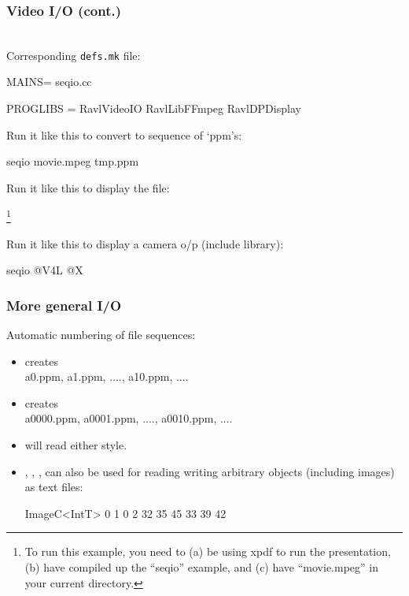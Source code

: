 \documentclass[landscape]{beamer}
\begin{document}
\begin{frame}[fragile]\frametitle{Video I/O (cont.)}

~\\
Corresponding {\tt defs.mk} file:

\begin{Code}
  MAINS= seqio.cc

  PROGLIBS = RavlVideoIO RavlLibFFmpeg RavlDPDisplay
\end{Code}

\vfill\pause Run it like this to convert to sequence of `ppm's:

\begin{VerbatimXterm}
  seqio movie.mpeg tmp.ppm
\end{VerbatimXterm}

\vfill\pause Run it like this to display the file:

\begin{VerbatimXterm}[commandchars=\\\{\}]
  \footnote{\tiny To run this example, you need to (a) be using xpdf to run the presentation, (b) have compiled up the ``seqio'' example, and (c) have ``movie.mpeg'' in your current directory.\vfill}
\end{VerbatimXterm}

\vfill\pause Run it like this to display a camera o/p (include  library):

\begin{VerbatimXterm}
  seqio @V4L @X
\end{VerbatimXterm}
\end{frame}


\begin{frame}[fragile]\frametitle{More general I/O}

Automatic numbering of file sequences:

\begin{itemize}
\item {} creates\\ a0.ppm, a1.ppm, ....,
  a10.ppm, ....

\pause\item {} creates\\ a0000.ppm, a0001.ppm, ....,
  a0010.ppm, ....
  
\pause\item {} will read either style.

\pause\item {}, , ,  can
  also be used for reading writing arbitrary objects (including images) as
  text files:

\begin{Code}
  ImageC<IntT>
  0 1 0 2
  32 35 45
  33 39 42
\end{Code}
\end{itemize}
\end{frame}
\end{document}
